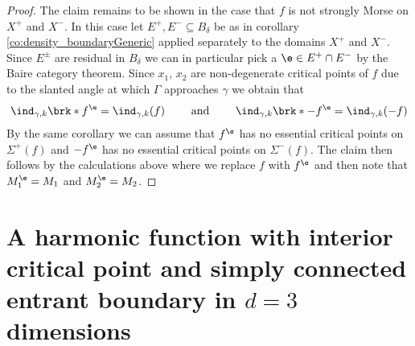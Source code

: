 \begin{proof}
  The claim remains to be shown in the case that $f$ is not strongly Morse on $X^+$ and $X^-$. In this case let
  $E^+,E^-\subseteq B_\delta$ be as in corollary \ref{co:density_boundaryGeneric} applied separately to the domains $X^+$ and $X^-$.
  Since $E^\pm$ are residual in $B_\delta$ we can in particular pick a $\e\in E^+\cap E^-$ by the Baire category theorem.
  Since $x_1$, $x_2$ are non-degenerate critical points of $f$
  due to the slanted angle at which
  $\Gamma$ approaches $\gamma$
  we obtain that
  \begin{align}
    \ind_{\gamma,k}\brk*{f^\e}=\ind_{\gamma,k}(f)\qquad\text{ and }\qquad 
    \ind_{\gamma,k}\brk*{-f^\e}=\ind_{\gamma,k}(-f)
    \label{eq:n3_disproof_morse_indexApprox}
  \end{align}
  By the same corollary we can assume that $f^\e$ has no essential critical points on
  $\Sigma^+(f)$ and $-f^\e$ has no essential critical points on $\Sigma^-(f)$.
  The claim then follows by the calculations above where we replace
  $f$ with $f^\e$ and then note that $M_1^\e=M_1$ and $M_2^\e=M_2$.
\end{proof}


\section{A harmonic function with interior critical point and simply connected entrant boundary in $d=3$ dimensions}

